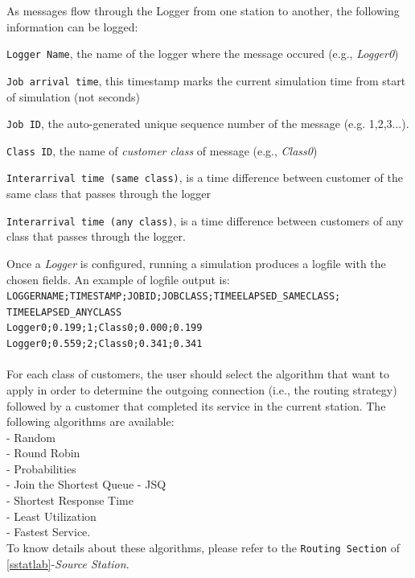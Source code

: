 As messages flow through the Logger from one station to another,
the following information can be logged:
\begin{itemize*} \item \texttt{Logger Name}, the name of the logger
where the message occured (e.g., \emph{Logger0}) \item \texttt{Job
arrival time}, this timestamp marks the current simulation time
from start of simulation (not seconds) \item \texttt{Job ID}, the
auto-generated unique sequence number of the message (e.g.
1,2,3...). \item \texttt{Class ID}, the name of \emph{customer
class} of message (e.g., \emph{Class0}) \item \texttt{Interarrival
time (same class)}, is a time difference between customer of the
same class that passes through the logger \item
\texttt{Interarrival time (any class)}, is a time difference
between customers of any class that passes through the logger.
\end{itemize*}

Once a \emph{Logger} is configured, running a simulation produces
a logfile with the chosen fields. An example
of logfile output is:\\
\texttt{LOGGERNAME;TIMESTAMP;JOBID;JOBCLASS;TIMEELAPSED\_SAMECLASS;
TIMEELAPSED\_ANYCLASS\\ Logger0;0.199;1;Class0;0.000;0.199\\
Logger0;0.559;2;Class0;0.341;0.341}\\

\\
For each class of customers, the user should select the algorithm
that want to apply in order to determine the outgoing connection
(i.e., the routing strategy) followed by a customer  that
completed its service in the current station.
The following algorithms are available:\\
- Random\\ - Round Robin\\ - Probabilities\\ - Join the Shortest Queue - JSQ\\
- Shortest Response Time\\ - Least Utilization\\ - Fastest Service.\\
To know details about these algorithms, please refer to the
\texttt{Routing Section} of \autoref{sstatlab}-\emph{Source
Station}.



